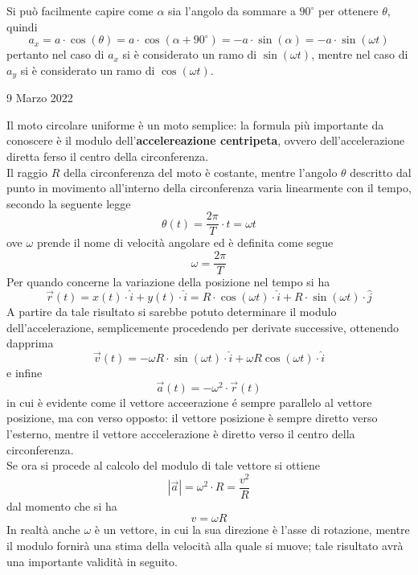 \documentclass[a4paper]{extarticle}
\begin{document}
\vspace{1em}
\noindent
Si può facilmente capire come $\alpha$ sia l'angolo da sommare a $90^\circ$ per ottenere $\theta$, quindi
\[a_x=a \cdot \cos(\theta) = a \cdot \cos(\alpha + 90^\circ) = -a \cdot \sin(\alpha) = -a \cdot \sin(\omega t)\]
pertanto nel caso di $a_x$ si è considerato un ramo di $\sin(\omega t)$, mentre nel caso di $a_y$ si è considerato un ramo di $\cos(\omega t)$.

\newpage
\noindent
\begin{center}
  9 Marzo 2022
\end{center}
Il moto circolare uniforme è un moto semplice: la formula più importante da conoscere è il modulo dell'\textbf{accelereazione centripeta}, ovvero dell'accelerazione diretta ferso il centro della circonferenza.\\
Il raggio $R$ della circonferenza del moto è costante, mentre l'angolo $\theta$ descritto dal punto in movimento all'interno della circonferenza varia linearmente con il tempo, secondo la seguente legge
\[\boxed{\theta(t) = \frac{2\pi}{T} \cdot t = \omega t}\]
ove $\omega$ prende il nome di velocità angolare ed è definita come segue
\[\boxed{\omega = \frac{2\pi}{T}}\]
Per quando concerne la variazione della posizione nel tempo si ha
\[\boxed{\vec{r}(t) = x(t) \cdot \hat{i} + y(t) \cdot \hat{i} = R \cdot \cos(\omega t) \cdot \hat{i} + R \cdot \sin(\omega t) \cdot \hat{j}}\]
A partire da tale risultato si sarebbe potuto determinare il modulo dell'accelerazione, semplicemente procedendo per derivate successive, ottenendo dapprima
\[\boxed{\vec{v}(t) = - \omega R \cdot \sin(\omega t) \cdot \hat{i} + \omega R \cos(\omega t) \cdot \hat{i}}\]
e infine
\[\boxed{\vec{a}(t) = -\omega^2 \cdot \vec{r}(t)}\]
in cui è evidente come il vettore acceerazione é sempre parallelo al vettore posizione, ma con verso opposto: il vettore posizione è sempre diretto verso l'esterno, mentre il vettore acccelerazione è diretto verso il centro della circonferenza.\\
Se ora si procede al calcolo del modulo di tale vettore si ottiene
\[\boxed{\left \vert \vec{a} \right \vert = \omega^2 \cdot R = \frac{v^2}{R}}\]
dal momento che si ha
\[\boxed{v = \omega R}\]
In realtà anche $\omega$ è un vettore, in cui la sua direzione è l'asse di rotazione, mentre il modulo fornirà una stima della velocità alla quale si muove; tale risultato avrà una importante validità in seguito.

\vspace{1em}
\end{document}
